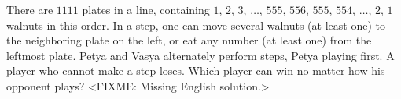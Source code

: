 \problem{}
There are $1111$ plates in a line, containing
$1$, $2$, $3$, $\ldots$, $555$, $556$, $555$, $554$, $\ldots$, $2$, $1$
walnuts in this order.
In a step, one can move several walnuts (at least one) to the neighboring plate on the
left, or eat any number (at least one) from the leftmost plate.
Petya and Vasya alternately perform steps, Petya playing first.
A player who cannot make a step loses.
Which player can win no matter how his opponent plays?
\solution
<FIXME: Missing English solution.>
\endproblem
